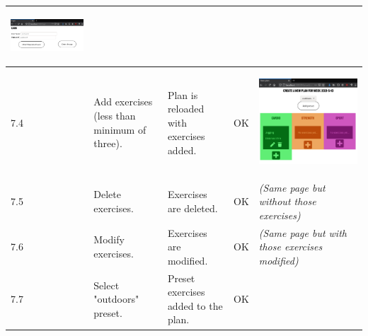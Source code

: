 \documentclass[12pt,twoside,titlepage,a4paper]{article}
\theoremstyle{definicion}
\theoremstyle{lema}
\theoremstyle{teorema}
\theoremstyle{corolario}
\theoremstyle{ejemplo}
\theoremstyle{nota}
\begin{document}
\begin{table}[!h]
\begin{tabular}{|m{0.6cm}|m{2.9cm}|m{3.6cm}|m{1.1cm}|m{5.9cm}|}
		\begin{center}\includegraphics[scale=0.22]{register2-login1.png}\end{center} \\
		\hline
		7.4 & Add exercises (less than minimum of three). & Plan is reloaded with exercises added. & OK & 
		\begin{center}\includegraphics[scale=0.22]{newplan3.png}\end{center} \\
		\hline
		7.5 & Delete exercises. & Exercises are deleted. & OK & \textit{(Same page but without those exercises)} \\
		\hline
		7.6 & Modify exercises. & Exercises are modified. & OK & \textit{(Same page but with those exercises modified)} \\
		\hline
		7.7 & Select "outdoors" preset. & Preset exercises added to the plan. & OK &

\end{tabular}
\end{table}
\end{document}

